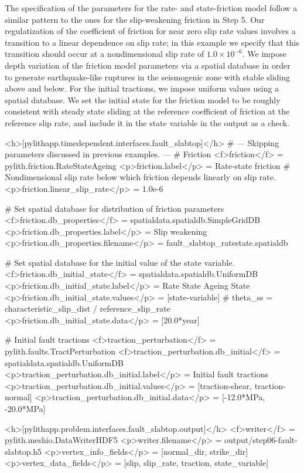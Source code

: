 The specification of the parameters for the rate- and state-friction
model follow a similar pattern to the ones for the slip-weakening
friction in Step 5. Our regulatization of the coefficient of friction
for near zero slip rate values involves a transition to a linear
dependence on slip rate; in this example we specify that this
transition should occur at a nondimensional slip rate of
$1.0 \times 10^{-6}$. We impose depth variation of the friction model
parameters via a  spatial database in order to
generate earthquake-like ruptures in the seismogenic zone with stable
sliding above and below. For the initial tractions, we impose uniform
values using a  spatial database. We set the initial
state for the friction model to be roughly consistent with steady
state sliding at the reference coefficient of friction at the
reference slip rate, and include it in the state variable in the
output as a check.
\begin{cfg}
<h>[pylithapp.timedependent.interfaces.fault_slabtop]</h>
# --- Skipping parameters discussed in previous examples. ---
# Friction
<f>friction</f> = pylith.friction.RateStateAgeing
<p>friction.label</p> = Rate-state friction
# Nondimensional slip rate below which friction depends linearly on slip rate.
<p>friction.linear_slip_rate</p> = 1.0e-6

# Set spatial database for distribution of friction parameters
<f>friction.db_properties</f> = spatialdata.spatialdb.SimpleGridDB
<p>friction.db_properties.label</p> = Slip weakening
<p>friction.db_properties.filename</p> = fault_slabtop_ratestate.spatialdb

# Set spatial database for the initial value of the state variable.
<f>friction.db_initial_state</f> = spatialdata.spatialdb.UniformDB
<p>friction.db_initial_state.label</p> = Rate State Ageing State
<p>friction.db_initial_state.values</p> = [state-variable]
# theta_ss = characteristic_slip_dist / reference_slip_rate
<p>friction.db_initial_state.data</p> = [20.0*year]

# Initial fault tractions
<f>traction_perturbation</f> = pylith.faults.TractPerturbation
<f>traction_perturbation.db_initial</f> = spatialdata.spatialdb.UniformDB
<p>traction_perturbation.db_initial.label</p> = Initial fault tractions
<p>traction_perturbation.db_initial.values</p> = [traction-shear, traction-normal]
<p>traction_perturbation.db_initial.data</p> = [-12.0*MPa, -20.0*MPa]

<h>[pylithapp.problem.interfaces.fault_slabtop.output]</h>
<f>writer</f> = pylith.meshio.DataWriterHDF5
<p>writer.filename</p> = output/step06-fault-slabtop.h5
<p>vertex_info_fields</p> = [normal_dir, strike_dir]
<p>vertex_data_fields</p> = [slip, slip_rate, traction, state_variable]
\end{cfg}

